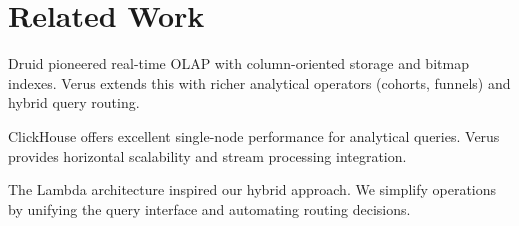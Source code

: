 \section{Related Work}


Druid \cite{druid2014} pioneered real-time OLAP with column-oriented storage and bitmap indexes. Verus extends this with richer analytical operators (cohorts, funnels) and hybrid query routing.

ClickHouse \cite{clickhouse2016} offers excellent single-node performance for analytical queries. Verus provides horizontal scalability and stream processing integration.

The Lambda architecture \cite{marz2015} inspired our hybrid approach. We simplify operations by unifying the query interface and automating routing decisions.


